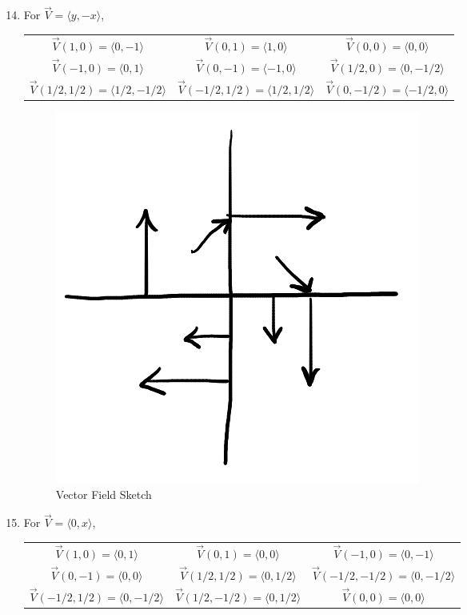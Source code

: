 \documentclass{article}
\begin{document}
\begin{enumerate}[1.]
  \setcounter{enumi}{13}
  \item For $\vec{V} = \langle y, -x \rangle$,
    \begin{center}
      \begin{tabular}{ c c c }
        $\vec{V}(1,0) = \langle 0, -1 \rangle$ & $\vec{V}(0,1) = \langle 1, 0
        \rangle$ & $\vec{V}(0,0) = \langle 0, 0 \rangle$ \\
        $\vec{V}(-1,0) = \langle 0, 1 \rangle$ & $\vec{V}(0,-1) = \langle -1, 0
        \rangle$ & $\vec{V}(1/2,0) = \langle 0, -1/2 \rangle$ \\
        $\vec{V}(1/2,1/2) = \langle 1/2, -1/2 \rangle$ & $\vec{V}(-1/2,1/2) =
        \langle 1/2, 1/2 \rangle$ & $\vec{V}(0,-1/2) = \langle -1/2, 0 \rangle$
      \end{tabular}
    \end{center}

    \begin{figure}[H]
      \centering
      \includegraphics[scale=0.45]{"VectorFieldSketch1"}
      \caption{Vector Field Sketch}
    \end{figure}
  \item For $\vec{V} = \langle 0, x \rangle$,
    \begin{center}
      \begin{tabular}{ c c c }
        $\vec{V}(1,0) = \langle 0, 1 \rangle$ & $\vec{V}(0,1) = \langle 0, 0
        \rangle$ & $\vec{V}(-1,0) = \langle 0, -1 \rangle$ \\
        $\vec{V}(0,-1) = \langle 0, 0 \rangle$ & $\vec{V}(1/2,1/2) = \langle 0,
        1/2 \rangle$ & $\vec{V}(-1/2,-1/2) = \langle 0, -1/2 \rangle$ \\
        $\vec{V}(-1/2,1/2) = \langle 0, -1/2 \rangle$ & $\vec{V}(1/2,-1/2) =
        \langle 0, 1/2 \rangle$ & $\vec{V}(0,0) = \langle 0, 0 \rangle$
      \end{tabular}
    \end{center}


\end{enumerate}
\end{document}
